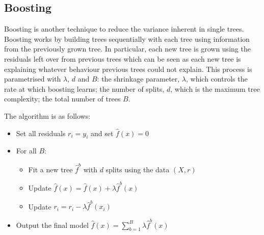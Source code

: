 \subsection{Boosting}

Boosting is another technique to reduce the variance inherent in single trees. Boosting works by building trees sequentially with each tree using information from the previously grown tree. In particular, each new tree is grown using the residuals left over from previous trees which can be seen as each new tree is explaining whatever behaviour previous trees could not explain. This process is parametrised with $\lambda$, $d$ and $B$: the shrinkage parameter, $\lambda$, which controls the rate at which boosting learns; the number of splits, $d$, which is the maximum tree complexity; the total number of trees $B$.

The algorithm is as follows:

\begin{itemize}
    \item Set all residuals $r_{i}=y_{i}$ and set $\hat{f}(x)=0$
    \item For all $B$: 
    \begin{itemize}
        \item Fit a new tree $\hat{f}^{b}$ with $d$ splits using the data $(X,r)$
        \item Update $\hat{f}(x)=\hat{f}(x)+\lambda\hat{f}^{b}(x)$
        \item Update $r_{i}=r_{i}-\lambda\hat{f}^{b}(x_{i})$
    \end{itemize}
    \item Output the final model $\hat{f}(x) = \sum^{B}_{b=1}\lambda\hat{f}^{b}(x)$
\end{itemize}
